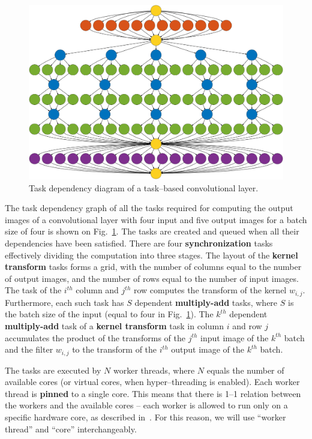 \documentclass[conference]{./IEEEtran}
\begin{document}
  \begin{figure}
    \begin{center}
      \includegraphics[width=0.85\columnwidth]{deps}
    \end{center}
    \caption{Task dependency diagram of a task--based convolutional
      layer.}
    \label{fig:task_deps}
  \end{figure}


  The task dependency graph of all the tasks required for computing
  the output images of a convolutional layer with four input and five
  output images for a batch size of four is shown on
  Fig.~\ref{fig:task_deps}.  The tasks are created and queued when all
  their dependencies have been satisfied.  There are four {\bf
    synchronization} tasks effectively dividing the computation into
  three stages.  The layout of the {\bf kernel transform} tasks forms
  a grid, with the number of columns equal to the number of output
  images, and the number of rows equal to the number of input images.
  The task of the $i^{th}$ column and $j^{th}$ row computes the
  transform of the kernel $w_{i,j}$.  Furthermore, each such task has
  $S$ dependent {\bf multiply-add} tasks, where $S$ is the batch size
  of the input (equal to four in Fig.~\ref{fig:task_deps}).  The
  $k^{th}$ dependent {\bf multiply-add} task of a {\bf kernel
    transform} task in column $i$ and row $j$ accumulates the product
  of the transforms of the $j^{th}$ input image of the $k^{th}$ batch
  and the filter $w_{i,j}$ to the transform of the $i^{th}$ output
  image of the $k^{th}$ batch.

  The tasks are executed by $N$ worker threads, where $N$ equals the
  number of available cores (or virtual cores, when hyper--threading
  is enabled).  Each worker thread is {\bf pinned} to a single core.
  This means that there is 1--1 relation between the workers and the
  available cores -- each worker is allowed to run only on a specific
  hardware core, as described in~\cite{jeffers2015high}.  For this
  reason, we will use ``worker thread'' and ``core'' interchangeably.
\end{document}
